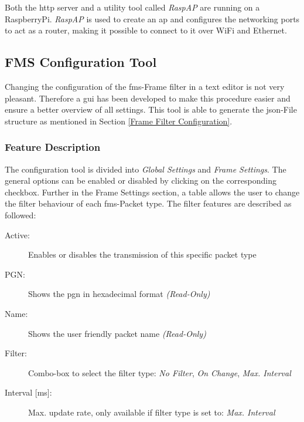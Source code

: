 Both the \acrshort{http} server and a utility tool called \textit{RaspAP} are running on a Raspberry\;Pi. \textit{RaspAP} is used to create an \acrlong{ap} and configures the networking ports to act as a router, making it possible to connect to it over WiFi and Ethernet.
\newpage

\newpage
\subsection{FMS Configuration Tool}
Changing the configuration of the \acrshort{fms}-Frame filter in a text editor is not very pleasant. Therefore a \acrfull{gui} has been developed to make this procedure easier and ensure a better overview of all settings. This tool is able to generate the \acrshort{json}-File structure as mentioned in Section \ref{Frame Filter Configuration}.

\subsubsection{Feature Description}
The configuration tool is divided into \textit{Global Settings} and \textit{Frame Settings}. The general options can be enabled or disabled by clicking on the corresponding checkbox. Further in the Frame Settings section, a table allows the user to change the filter behaviour of each \acrshort{fms}-Packet type. The filter features are described as followed:

\begin{description}
  \item[Active:] Enables or disables the transmission of this specific packet type
  \item[PGN:] Shows the \acrlong{pgn} in hexadecimal format \textit{(Read-Only)}
  \item[Name:] Shows the user friendly packet name \textit{(Read-Only)}
  \item[Filter:] Combo-box to select the filter type: \textit{No Filter}, \textit{On Change}, \textit{Max. Interval}
  \item[{Interval [ms]:}] Max. update rate, only available if filter type is set to: \textit{Max. Interval}
\end{description}

